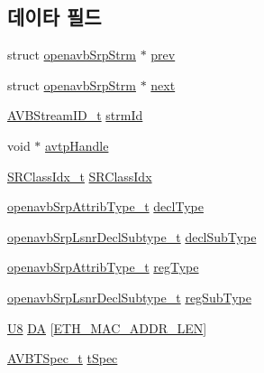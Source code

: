 \subsection*{데이타 필드}
\begin{DoxyCompactItemize}
\item 
struct \hyperlink{structopenavb_srp_strm}{openavb\+Srp\+Strm} $\ast$ \hyperlink{structopenavb_srp_strm_ab5251de873929eead67dee4ba7f15d8a}{prev}
\item 
struct \hyperlink{structopenavb_srp_strm}{openavb\+Srp\+Strm} $\ast$ \hyperlink{structopenavb_srp_strm_ae0b5dd5717d4dade7a41eaddee71905b}{next}
\item 
\hyperlink{struct_a_v_b_stream_i_d__t}{A\+V\+B\+Stream\+I\+D\+\_\+t} \hyperlink{structopenavb_srp_strm_ae42f768866b4707b89a0d43f45bbf41e}{strm\+Id}
\item 
void $\ast$ \hyperlink{structopenavb_srp_strm_a4b9351eb0c3d027b65d2babae355d2c1}{avtp\+Handle}
\item 
\hyperlink{openavb__types__base__pub_8h_a4d8ccbeaf8ad040d8880e8971fc62752}{S\+R\+Class\+Idx\+\_\+t} \hyperlink{structopenavb_srp_strm_a0cacd3a7dd55c91ca8a384f337b2cd5e}{S\+R\+Class\+Idx}
\item 
\hyperlink{openavb__srp__api_8h_a7ce5dfba4778303642ed038768d95bd2}{openavb\+Srp\+Attrib\+Type\+\_\+t} \hyperlink{structopenavb_srp_strm_a23ebfbe769e77222f962d8ac98cef81e}{decl\+Type}
\item 
\hyperlink{openavb__srp__api_8h_afecaf0f6deca515a5b80d49fa8c3db8b}{openavb\+Srp\+Lsnr\+Decl\+Subtype\+\_\+t} \hyperlink{structopenavb_srp_strm_abc93f9f17a3050ab69dabfc1ead7109f}{decl\+Sub\+Type}
\item 
\hyperlink{openavb__srp__api_8h_a7ce5dfba4778303642ed038768d95bd2}{openavb\+Srp\+Attrib\+Type\+\_\+t} \hyperlink{structopenavb_srp_strm_a1d02359d793a1e3b15326aa32a45af02}{reg\+Type}
\item 
\hyperlink{openavb__srp__api_8h_afecaf0f6deca515a5b80d49fa8c3db8b}{openavb\+Srp\+Lsnr\+Decl\+Subtype\+\_\+t} \hyperlink{structopenavb_srp_strm_aaaebdabb6f9f66f3eec3a68525b0756b}{reg\+Sub\+Type}
\item 
\hyperlink{openavb__types__base__pub_8h_aa63ef7b996d5487ce35a5a66601f3e73}{U8} \hyperlink{structopenavb_srp_strm_a4b06cae76504947bf16ff5e19c96dbe5}{DA} \mbox{[}\hyperlink{openavb__types__base_8h_a5f33fe3e3c8ef29702104a31bb37bf40}{E\+T\+H\+\_\+\+M\+A\+C\+\_\+\+A\+D\+D\+R\+\_\+\+L\+EN}\mbox{]}
\item 
\hyperlink{struct_a_v_b_t_spec__t}{A\+V\+B\+T\+Spec\+\_\+t} \hyperlink{structopenavb_srp_strm_ab928eca0e7b010a8cc3a80be5bc8adcc}{t\+Spec}

\end{DoxyCompactItemize}
